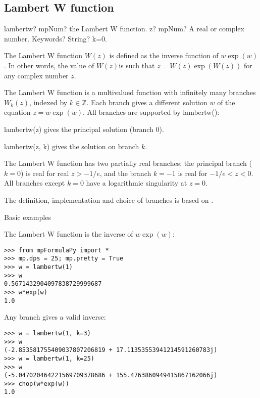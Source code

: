\subsection{Lambert W function}

\begin{mpFunctionsExtract}
	\mpFunctionTwo
	{lambertw? mpNum? the Lambert W function.}
	{z? mpNum? A real or complex number.}
	{Keywords? String? k=0.}	
\end{mpFunctionsExtract}

\vpara
The Lambert W function $W(z)$ is defined as the inverse function of $w \exp(w)$. In other words, the value of $W(z) $is such that $z=W(z) \exp(W(z))$ for any complex number $z$.

\vpara
The Lambert W function is a multivalued function with infinitely many branches $W_k(z)$, indexed by $k \in \mathbb{Z}$. Each branch gives a different solution $w$ of the equation $z=w \exp(w)$. All branches are supported by lambertw():

\vpara
lambertw(z) gives the principal solution (branch 0).

\vpara
lambertw(z, k) gives the solution on branch $k$.

\vpara
The Lambert W function has two partially real branches: the principal branch ($k=0$) is real for real $z>-1/e$, and the branch $k=-1$ is real for $-1/e <z<0$. All branches except $k=0$ have a logarithmic singularity at $z=0$.

\vpara
The definition, implementation and choice of branches is based on \cite{Corless96onthe}.

\vpara
Basic examples

The Lambert W function is the inverse of $w \exp(w)$:

\begin{lstlisting}
>>> from mpFormulaPy import *
>>> mp.dps = 25; mp.pretty = True
>>> w = lambertw(1)
>>> w
0.5671432904097838729999687
>>> w*exp(w)
1.0
\end{lstlisting}

Any branch gives a valid inverse:
\begin{lstlisting}
>>> w = lambertw(1, k=3)
>>> w
(-2.853581755409037807206819 + 17.11353553941214591260783j)
>>> w = lambertw(1, k=25)
>>> w
(-5.047020464221569709378686 + 155.4763860949415867162066j)
>>> chop(w*exp(w))
1.0
\end{lstlisting}





